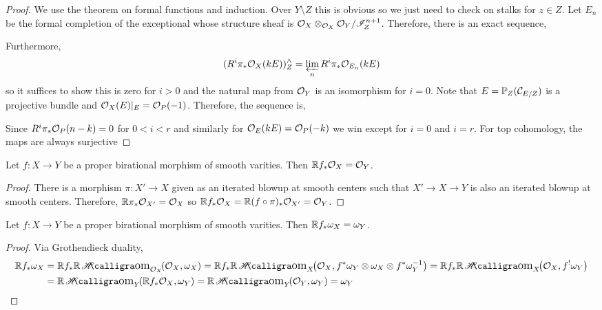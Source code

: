\documentclass[12pt]{article}
\begin{document}
\begin{proof}
We use the theorem on formal functions and induction. Over $Y \setminus Z$ this is obvious so we just need to check on stalks for $z \in Z$. Let $E_n$ be the formal completion of the exceptional whose structure sheaf is $\mathcal{O}_{X} \otimes_{\mathcal{O}_{X}} \mathcal{O}_{Y} / \mathscr{I}_Z^{n+1}$. Therefore, there is an exact sequence,
\begin{center}
\end{center}
Furthermore,
\[ (R^i \pi_* \mathcal{O}_{X}(k E))^{\wedge}_Z = \operatorname*{\varprojlim}_n R^i \pi_* \mathcal{O}_{E_n}(k E) \]
so it suffices to show this is zero for $i > 0$ and the natural map from $\mathcal{O}_{Y}$ is an isomorphism for $i = 0$. Note that $E = \mathbb{P}_Z(\mathcal{C}_{E/Z})$ is a projective bundle and $\mathcal{O}_{X}(E)|_E = \mathcal{O}_{P}(-1)$. Therefore, the sequence is,
\begin{center}
\end{center}
Since $R^{i} \pi_* \mathcal{O}_{P}(n-k) = 0$ for $0 < i < r$ and similarly for $\mathcal{O}_{E}(kE) = \mathcal{O}_{P}(-k)$ we win except for $i = 0$ and $i = r$. For top cohomology, the maps are always surjective 
\end{proof}

\begin{prop}
Let $f : X \to Y$ be a proper birational morphism of smooth varities. Then $\mathbb{R} f_* \mathcal{O}_{X} = \mathcal{O}_{Y}$.
\end{prop}

\begin{proof}
There is a morphism $\pi : X' \to X$ given as an iterated blowup at smooth centers such that $X' \to X \to Y$ is also an iterated blowup at smooth centers. Therefore, $\mathbb{R} \pi_* \mathcal{O}_{X'} = \mathcal{O}_{X}$ so $\mathbb{R} f_* \mathcal{O}_{X} = \mathbb{R} (f \circ \pi)_* \mathcal{O}_{X'} = \mathcal{O}_{Y}$. 
\end{proof}

\begin{cor}
Let $f : X \to Y$ be a proper birational morphism of smooth varities. Then $\mathbb{R} f_* \omega_X = \omega_Y$.
\end{cor}

\begin{proof}
Via Grothendieck duality,
\begin{align*}
\RR f_* \omega_X & = \RR f_* \RR \shHom{\struct{X}}{\struct{X}}{\omega_X} = \RR f_* \RR \shHom{X}{\struct{X}}{f^* \omega_Y \ot \omega_X \ot f^* \omega_Y^{-1}}
 = \RR f_* \RR \shHom{X}{\struct{X}}{f^! \omega_Y} 
\\
&= \RR \shHom{Y}{\RR f_* \struct{X}}{\omega_Y} = \RR \shHom{Y}{\struct{Y}}{\omega_Y} = \omega_Y
\end{align*}
\end{proof}
\end{document}
